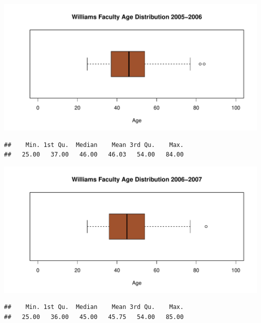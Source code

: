 \documentclass[12pt,a4paper]{article}\usepackage[]{graphicx}\usepackage[]{color}
\makeatletter
\def\maxwidth{ %
  \ifdim\Gin@nat@width>\linewidth
    \linewidth
  \else
    \Gin@nat@width
  \fi
}
\newenvironment{kframe}{%
 \def\at@end@of@kframe{}%
 \ifinner\ifhmode%
  \def\at@end@of@kframe{\end{minipage}}%
  \begin{minipage}{\columnwidth}%
 \fi\fi%
 \def\FrameCommand##1{\hskip\@totalleftmargin \hskip-\fboxsep
 \colorbox{shadecolor}{##1}\hskip-\fboxsep
     \hskip-\linewidth \hskip-\@totalleftmargin \hskip\columnwidth}%
 \MakeFramed {\advance\hsize-\width
   \@totalleftmargin\z@ \linewidth\hsize
   \@setminipage}}%
 {\par\unskip\endMakeFramed%
 \at@end@of@kframe}
\newenvironment{knitrout}{}{} %
\theoremstyle{definition}
\makeatother
\begin{document}
\begin{knitrout}
\color{fgcolor}
\includegraphics[width=\maxwidth]{figure/unnamed-chunk-16-1} 

\end{knitrout}

\begin{knitrout}
\color{fgcolor}\begin{kframe}
\begin{verbatim}
##    Min. 1st Qu.  Median    Mean 3rd Qu.    Max. 
##   25.00   37.00   46.00   46.03   54.00   84.00
\end{verbatim}
\end{kframe}
\end{knitrout}


\begin{knitrout}
\color{fgcolor}
\includegraphics[width=\maxwidth]{figure/unnamed-chunk-18-1} 

\end{knitrout}

\begin{knitrout}
\color{fgcolor}\begin{kframe}
\begin{verbatim}
##    Min. 1st Qu.  Median    Mean 3rd Qu.    Max. 
##   25.00   36.00   45.00   45.75   54.00   85.00
\end{verbatim}
\end{kframe}
\end{knitrout}
\end{document}
